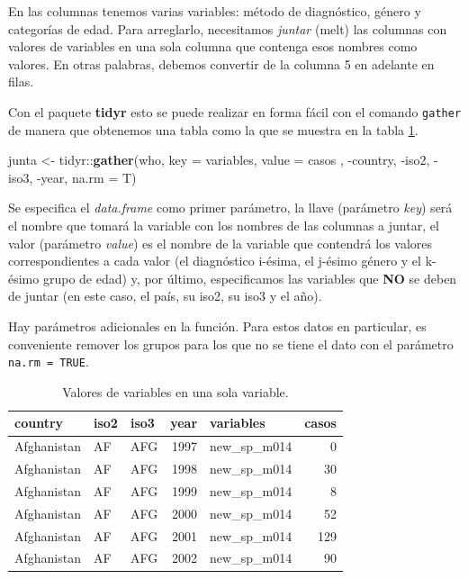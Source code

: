 \documentclass[]{article}
\newenvironment{Shaded}{\begin{snugshade}}{\end{snugshade}}
\newcommand{\KeywordTok}[1]{\textcolor[rgb]{0.13,0.29,0.53}{\textbf{{#1}}}}
\newcommand{\DataTypeTok}[1]{\textcolor[rgb]{0.13,0.29,0.53}{{#1}}}
\newcommand{\StringTok}[1]{\textcolor[rgb]{0.31,0.60,0.02}{{#1}}}
\newcommand{\NormalTok}[1]{{#1}}
\begin{document}
En las columnas tenemos varias variables: método de diagnóstico, género
y categorías de edad. Para arreglarlo, necesitamos \emph{juntar} (melt)
las columnas con valores de variables en una sola columna que contenga
esos nombres como valores. En otras palabras, debemos convertir de la
columna 5 en adelante en filas.

Con el paquete \textbf{tidyr} esto se puede realizar en forma fácil con
el comando \texttt{gather} de manera que obtenemos una tabla como la que
se muestra en la tabla \ref{tab:varsjuntadas}.

\begin{Shaded}
\begin{Highlighting}[]
\NormalTok{junta <-}\StringTok{ }\NormalTok{tidyr::}\KeywordTok{gather}\NormalTok{(who, }\DataTypeTok{key =} \NormalTok{variables, }\DataTypeTok{value =} \NormalTok{casos}
                       \NormalTok{, -country, -iso2, -iso3, -year, }\DataTypeTok{na.rm =} \NormalTok{T)}
\end{Highlighting}
\end{Shaded}

Se especifica el \emph{data.frame} como primer parámetro, la llave
(parámetro \emph{key}) será el nombre que tomará la variable con los
nombres de las columnas a juntar, el valor (parámetro \emph{value}) es
el nombre de la variable que contendrá los valores correspondientes a
cada valor (el diagnóstico i-ésima, el j-ésimo género y el k-ésimo grupo
de edad) y, por último, especificamos las variables que \textbf{NO} se
deben de juntar (en este caso, el país, su iso2, su iso3 y el año).

Hay parámetros adicionales en la función. Para estos datos en
particular, es conveniente remover los grupos para los que no se tiene
el dato con el parámetro \texttt{na.rm\ =\ TRUE}.

\begin{table}[ht]
\centering
\begingroup\tiny
\begin{tabular}{lllrlr}
  \hline
country & iso2 & iso3 & year & variables & casos \\ 
  \hline
Afghanistan & AF & AFG & 1997 & new\_sp\_m014 &   0 \\ 
  Afghanistan & AF & AFG & 1998 & new\_sp\_m014 &  30 \\ 
  Afghanistan & AF & AFG & 1999 & new\_sp\_m014 &   8 \\ 
  Afghanistan & AF & AFG & 2000 & new\_sp\_m014 &  52 \\ 
  Afghanistan & AF & AFG & 2001 & new\_sp\_m014 & 129 \\ 
  Afghanistan & AF & AFG & 2002 & new\_sp\_m014 &  90 \\ 
   \hline
\end{tabular}
\endgroup
\caption{Valores de variables en una sola variable.} 
\label{tab:varsjuntadas}
\end{table}
\end{document}
